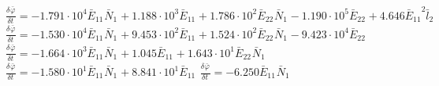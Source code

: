 $\frac{{\delta}^{} {\bar{\varphi}}_{}}{{\delta} {{{t}}_{}}^{}} = -1.791\cdot 10^{4}{{{\bar{E}}_{11}}^{}{{\bar{N}}_{1}}^{}} + 1.188\cdot 10^{3}{{{\bar{E}}_{11}}^{}} + 1.786\cdot 10^{2}{{{\bar{E}}_{22}}^{}{{\bar{N}}_{1}}^{}} - 1.190\cdot 10^{5}{{{\bar{E}}_{22}}^{}} + 4.646{{{\bar{E}}_{11}}^{2}{{\bar{l}}_{2}}^{}}$
$\frac{{\delta}^{} {\bar{\varphi}}_{}}{{\delta} {{{t}}_{}}^{}} = -1.530\cdot 10^{4}{{{\bar{E}}_{11}}^{}{{\bar{N}}_{1}}^{}} + 9.453\cdot 10^{2}{{{\bar{E}}_{11}}^{}} + 1.524\cdot 10^{2}{{{\bar{E}}_{22}}^{}{{\bar{N}}_{1}}^{}} - 9.423\cdot 10^{4}{{{\bar{E}}_{22}}^{}}$
$\frac{{\delta}^{} {\bar{\varphi}}_{}}{{\delta} {{{t}}_{}}^{}} = -1.664\cdot 10^{3}{{{\bar{E}}_{11}}^{}{{\bar{N}}_{1}}^{}} + 1.045{{{\bar{E}}_{11}}^{}} + 1.643\cdot 10^{1}{{{\bar{E}}_{22}}^{}{{\bar{N}}_{1}}^{}}$
$\frac{{\delta}^{} {\bar{\varphi}}_{}}{{\delta} {{{t}}_{}}^{}} = -1.580\cdot 10^{1}{{{\bar{E}}_{11}}^{}{{\bar{N}}_{1}}^{}} + 8.841\cdot 10^{1}{{{\bar{E}}_{11}}^{}}$
$\frac{{\delta}^{} {\bar{\varphi}}_{}}{{\delta} {{{t}}_{}}^{}} = -6.250{{{\bar{E}}_{11}}^{}{{\bar{N}}_{1}}^{}}$
